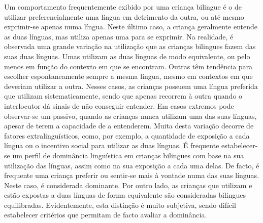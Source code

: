 \documentclass[output=paper]{LSP/langsci}
\begin{document}
Um comportamento frequentemente exibido por uma criança bilingue é o de utilizar preferencialmente uma língua em detrimento da outra, ou até mesmo exprimir-se apenas numa língua. Neste último caso, a criança geralmente entende as duas línguas, mas utiliza apenas uma para se exprimir. Na realidade, é observada uma grande variação na utilização que as crianças bilingues fazem das suas duas línguas. Umas utilizam as duas línguas de modo equivalente, ou pelo menos em função do contexto em que se encontram. Outras têm tendência para escolher espontaneamente sempre a mesma língua, mesmo em contextos em que deveriam utilizar a outra. Nesses casos, as crianças possuem uma língua preferida que utilizam sistematicamente, sendo que apenas recorrem à outra quando o interlocutor dá sinais de não conseguir entender. Em casos extremos pode observar-se um  passivo, quando as crianças nunca utilizam uma das suas línguas, apesar de terem a capacidade de a entenderem. Muita desta variação decorre de fatores extralinguísticos, como, por exemplo, a quantidade de exposição a cada língua ou o incentivo social para utilizar as duas línguas. É frequente estabelecer-se um perfil de dominância linguística em crianças bilingues com base na sua utilização das línguas, assim como na sua exposição a cada uma delas. De facto, é frequente uma criança preferir ou sentir-se mais à vontade numa das suas línguas. Neste caso, é considerada dominante. Por outro lado, as crianças que utilizam e estão expostas a duas línguas de forma equivalente são consideradas bilingues equilibradas. Evidentemente, esta distinção é muito subjetiva, sendo difícil estabelecer critérios que permitam de facto avaliar a dominância. 
\end{document}
